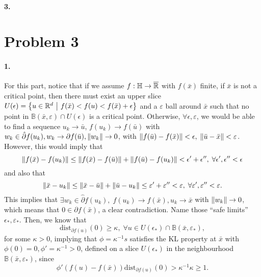 \documentclass[10pt]{article}
\begin{document}
\paragraph{3.}

\section*{Problem 3}
\paragraph{1.}
For this part, notice that if we assume $f: \mathbb{H} \to \overline{\mathbb{R}}$ with
$f(\bar{x})$ finite, if $\bar{x}$ is not a critical point, then there must
exist an upper slice $U(\epsilon) = \left\{ u \in \mathbb{R}^d \ \middle| \  f(\bar{x}) < f(u) <
f(\bar{x}) + \epsilon \right\}$ and a $\varepsilon$ ball around $\bar{x}$ such that no
point in $\mathbb{B}(\bar{x}, \varepsilon) \cap U(\epsilon)$ is a critical
point. Otherwise, $\forall \epsilon, \varepsilon$, we would be able to find a
sequence $u_k \to \bar{u}$, $f(u_k) \to f(\bar{u})$
with $w_k \in \hat{\partial} f(u_k), w_k \to \partial f(\bar{u}), \left \| w_k \right \|
\to 0$, with $\left \| f(\bar{u}) - f(\bar{x}) \right \| < \epsilon, \; \left \| \bar{u} -
\bar{x} \right \| < \varepsilon$. However, this would imply that
\[
    \left \| f(\bar{x}) - f(u_k) \right \| \leq \left \| f(\bar{x}) - f(\bar{u}) \right \|
    + \left \| f(\bar{u}) - f(u_k) \right \| < \epsilon' + \epsilon'', \; \forall
    \epsilon', \epsilon'' < \epsilon
\]
and also that
\[
    \left \| \bar{x} - u_k \right \| \leq \left \| \bar{x} - \bar{u} \right \| + \left \| \bar{u}- u_k \right \|
    \leq \varepsilon' + \varepsilon'' < \varepsilon, \; \forall
    \varepsilon', \varepsilon'' < \varepsilon.
\]
This implies that $\exists w_k \in \hat{\partial} f(u_k), \; f(u_k) \to
f(\bar{x}), u_k \to \bar{x}$ with $\left \| w_k \right \| \to 0$, which means that $0 \in
\partial f(\bar{x})$, a clear contradiction.
Name those ``safe limits'' $\epsilon_*, \varepsilon_*$. Then, we know that
\[
    \mathrm{dist}_{\partial f(u)}(0) \geq \kappa, \; \forall u
    \in U(\epsilon_*) \cap \mathbb{B}(\bar{x}, \varepsilon_*),
\]
for some $\kappa > 0$, implying that $\phi = \kappa^{-1} s$ satisfies the
KL property at $\bar{x}$ with $\phi(0) = 0, \phi' = \kappa^{-1} > 0$, defined
on a slice $U(\epsilon_*)$ in the neighbourhood $\mathbb{B}(\bar{x},
\varepsilon_*)$, since
\[
    \phi'(f(u) - f(\bar{x})) \mathrm{dist}_{\partial f(u)}(0) >
    \kappa^{-1} \kappa \geq 1.
\]
\end{document}
